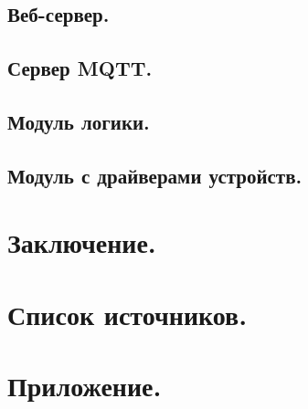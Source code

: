 \subsection{Веб-сервер.}

\subsection{Сервер MQTT.}

\subsection{Модуль логики.}

\subsection{Модуль с драйверами устройств.}

\clearpage

\section{Заключение.}

\clearpage

\section{Список источников.}

\clearpage

\section{Приложение.}
